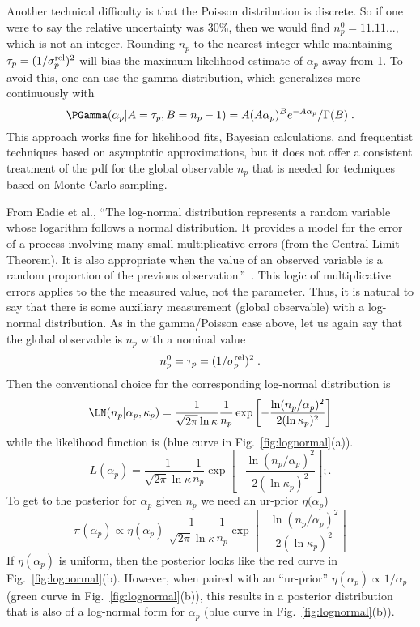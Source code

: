 Another technical difficulty is that the Poisson distribution is discrete. So if one were to say the relative uncertainty was 30\%, then we would find $n_p^0=11.11...$, which is not an integer.  Rounding $n_p$ to the nearest integer while maintaining $\tau_p= (1/\sigma_{p}^{\rm rel})^2$ will bias the maximum likelihood estimate of $\alpha_p$ away from 1.  To avoid this, one can use the gamma distribution, which generalizes more continuously with 
\begin{equation}
\PGamma(\alpha_p | A=\tau_p, B=n_p-1) = A (A \alpha_p)^{B} e^{-A \alpha_p} / \Gamma(B)\;.
\end{equation}
This approach works fine for likelihood fits, Bayesian calculations, and frequentist techniques based on asymptotic approximations, but it does not offer a consistent treatment of the pdf for the global observable $n_p$ that is needed for techniques based on Monte Carlo sampling. 


From Eadie et al., ``The log-normal distribution represents a random variable whose logarithm follows a normal distribution. It provides a model for the error of a process involving many small multiplicative errors (from the Central Limit Theorem). It is also appropriate when the value of an observed variable is a random proportion of the previous observation.''~\cite{Eadie:qy,CousinsLogNormal}.  This logic of multiplicative errors applies to the the measured value, not the parameter.  Thus, it is natural to say that there is some auxiliary measurement (global observable) with a log-normal distribution.  As in the gamma/Poisson case above, let us again say that the global observable is $n_p$ with a nominal value
\begin{equation}
n_p^0 =  \tau_p = (1/\sigma_{p}^{\rm rel})^2\; .
\end{equation}
Then the conventional choice for the corresponding log-normal distribution is
\begin{equation}
\LN(n_p | \alpha_p, \kappa_p) = \frac{1}{\sqrt{2\pi}\ln \kappa}\frac{1}{n_p} \exp \left[ -\frac{\ln(n_p/ \alpha_p)^2}{2(\ln \kappa_p)^2} \right]
\end{equation}
while the likelihood function is (blue curve in Fig.~\ref{fig:lognormal}(a)).
\begin{equation}
L( \alpha_p) = \frac{1}{\sqrt{2\pi}\ln \kappa}\frac{1}{n_p} \exp \left[ -\frac{\ln(n_p/ \alpha_p)^2}{2(\ln \kappa_p)^2} \right];.
\end{equation}
To get to the posterior for $\alpha_p$ given $n_p$ we need an ur-prior $\eta(\alpha_p$)
\begin{equation}
\pi( \alpha_p) \propto \eta(\alpha_p)  \; \frac{1}{\sqrt{2\pi}\ln \kappa}\frac{1}{n_p} \exp \left[ -\frac{\ln(n_p/ \alpha_p)^2}{2(\ln \kappa_p)^2} \right]
\end{equation}
If $\eta(\alpha_p)$ is uniform, then the posterior looks like the red curve in Fig.~\ref{fig:lognormal}(b).  However, when paired with an ``ur-prior'' $\eta(\alpha_p) \propto 1/\alpha_p$ (green curve in Fig.~\ref{fig:lognormal}(b)), this results in a posterior distribution that is also of a log-normal form for $\alpha_p$ (blue curve in Fig.~\ref{fig:lognormal}(b)).
